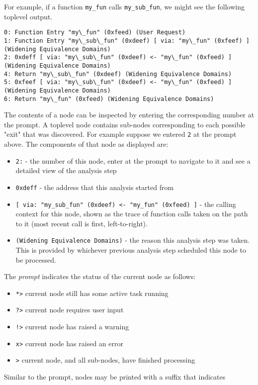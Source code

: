 For example, if a function \texttt{my\_fun} calls \texttt{my\_sub\_fun},
we might see the following toplevel output. 
\begin{verbatim}
0: Function Entry "my\_fun" (0xfeed) (User Request)
1: Function Entry "my\_sub\_fun" (0xdeef) [ via: "my\_fun" (0xfeef) ]  (Widening Equivalence Domains)
2: 0xdeff [ via: "my\_sub\_fun" (0xdeef) <- "my\_fun" (0xfeed) ] (Widening Equivalence Domains)
4: Return "my\_sub\_fun" (0xdeef) (Widening Equivalence Domains)
5: 0xfeef [ via: "my\_sub\_fun" (0xdeef) <- "my\_fun" (0xfeed) ] (Widening Equivalence Domains)
6: Return "my\_fun" (0xfeed) (Widening Equivalence Domains)
\end{verbatim}
The contents of a node can be inspected by entering the corresponding
number at the prompt. A toplevel node contains sub-nodes corresponding
to each possible "exit" that was discovered.  For example suppose we
entered \texttt{2} at the prompt above.  The components of that node as
displayed are:
\begin{itemize}
  \item\texttt{2:} - the number of this node, enter at the prompt to navigate to it
    and see a detailed view of the analysis step
\item\texttt{0xdeff} - the address that this analysis started from
\item \texttt{[ via: "my\_sub\_fun" (0xdeef) <- "my\_fun" (0xfeed) ]} -
    the calling context for this node, shown as the trace of function calls taken on the path
    to it (most recent call is first, left-to-right).
\item \texttt{(Widening Equivalence Domains)} - the reason this analysis
  step was taken. This is provided by whichever previous analysis step
  scheduled this node to be  processed. 
\end{itemize}
The \emph{prompt} indicates the status of the current node as follows:
\begin{itemize}
\item \texttt{*>} current node still has some active task running
\item \texttt{?>} current node requires user input
\item \texttt{!>} current node has raised a warning
\item \texttt{x>} current node has raised an error
\item \texttt{>} current node, and all sub-nodes, have finished processing
\end{itemize}
Similar to the prompt, nodes may be printed with a suffix that indicates
